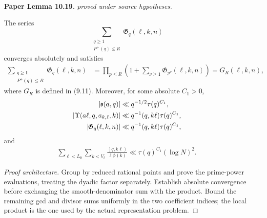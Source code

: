\begin{lemma}
\label{goldbach_euler}
\leanok
\par\medskip\noindent\textbf{Paper Lemma 10.19.} \textit{proved under source hypotheses.}\par
The series
\[
 \sum_{\substack{q\geq1\\P^+(q)\leq R}}
 \mathfrak G_q(\ell,k,n)
\]
converges absolutely and satisfies
\begin{align}
 \sum_{\substack{q\geq1\\P^+(q)\leq R}}
 \mathfrak G_q(\ell,k,n)
 &=
 \prod_{p\leq R}
 \left(1+\sum_{\nu\geq1}
 \mathfrak G_{p^\nu}(\ell,k,n)\right)
 =G_R(\ell,k,n),
\end{align}
where \(G_R\) is defined in \textup{(9.11)}.
Moreover, for some absolute \(C_1>0\),
\begin{align}
 |\mathfrak s(a,q)|
 &\ll q^{-1/2}\tau(q)^{C_1},\notag\\
 |\Upsilon(a\ell,q,a_{k,\ell},k)|
 &\ll q^{-1}(q,k\ell)\tau(q)^{C_1},\\
 |\mathfrak G_q(\ell,k,n)|
 &\ll q^{-1}(q,k\ell)\tau(q)^{C_1},\notag
\end{align}
and
\begin{align}
 \sum_{\ell<L_0}\sum_{k<V_\ell}
 \frac{(q,k\ell)}{\ell\phi(k)}
 \ll \tau(q)^{C_1}(\log N)^2.
\end{align}
\end{lemma}
\begin{proof}[Proof architecture]
\leanok
Group by reduced rational points and prove the prime-power evaluations, treating the dyadic factor separately. Establish absolute convergence before exchanging the smooth-denominator sum with the product. Bound the remaining gcd and divisor sums uniformly in the two coefficient indices; the local product is the one used by the actual representation problem.
\end{proof}

